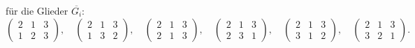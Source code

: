 \documentclass[11pt]{article}
\begin{document}
für die Glieder $\overline{G_i}$:
\[
\begin{pmatrix}2&1&3\\1&2&3\end{pmatrix}, \quad
\begin{pmatrix}2&1&3\\1&3&2\end{pmatrix}, \quad
\begin{pmatrix}2&1&3\\2&1&3\end{pmatrix}, \quad
\begin{pmatrix}2&1&3\\2&3&1\end{pmatrix}, \quad
\begin{pmatrix}2&1&3\\3&1&2\end{pmatrix}, \quad
\begin{pmatrix}2&1&3\\3&2&1\end{pmatrix}.
\]
\end{document}
